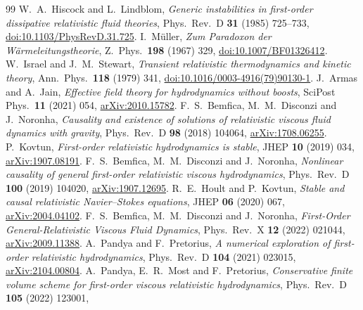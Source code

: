 \clearpage
{}
{}
\begin{thebibliography}{99}
\setlength{\itemsep}{2.5pt}
W.~A.~Hiscock and L.~Lindblom, \emph{Generic instabilities in first-order
dissipative relativistic fluid theories}, Phys.\ Rev.\ D \textbf{31}
(1985) 725--733,
\href{https://doi.org/10.1103/PhysRevD.31.725}{doi:10.1103/PhysRevD.31.725}.
I.~M\"uller, \emph{Zum Paradoxon der W\"armeleitungstheorie},
Z.\ Phys.\ \textbf{198} (1967) 329,
\href{https://doi.org/10.1007/BF01326412}{doi:10.1007/BF01326412}.
W.~Israel and J.~M.~Stewart, \emph{Transient relativistic thermodynamics
and kinetic theory}, Ann.\ Phys.\ \textbf{118} (1979) 341,
\href{https://doi.org/10.1016/0003-4916(79)90130-1}{doi:10.1016/0003-4916(79)90130-1}.
J.~Armas and A.~Jain, \emph{Effective field theory for hydrodynamics
without boosts}, SciPost Phys.\ \textbf{11} (2021) 054,
\href{https://arxiv.org/abs/2010.15782}{arXiv:2010.15782}.
F.~S.~Bemfica, M.~M.~Disconzi and J.~Noronha, \emph{Causality and existence
of solutions of relativistic viscous fluid dynamics with gravity},
Phys.\ Rev.\ D \textbf{98} (2018) 104064,
\href{https://arxiv.org/abs/1708.06255}{arXiv:1708.06255}.
P.~Kovtun, \emph{First-order relativistic hydrodynamics is stable},
JHEP \textbf{10} (2019) 034,
\href{https://arxiv.org/abs/1907.08191}{arXiv:1907.08191}.
F.~S.~Bemfica, M.~M.~Disconzi and J.~Noronha, \emph{Nonlinear causality
of general first-order relativistic viscous hydrodynamics},
Phys.\ Rev.\ D \textbf{100} (2019) 104020,
\href{https://arxiv.org/abs/1907.12695}{arXiv:1907.12695}.
R.~E.~Hoult and P.~Kovtun, \emph{Stable and causal relativistic
Navier--Stokes equations}, JHEP \textbf{06} (2020) 067,
\href{https://arxiv.org/abs/2004.04102}{arXiv:2004.04102}.
F.~S.~Bemfica, M.~M.~Disconzi and J.~Noronha, \emph{First-Order
General-Relativistic Viscous Fluid Dynamics}, Phys.\ Rev.\ X
\textbf{12} (2022) 021044,
\href{https://arxiv.org/abs/2009.11388}{arXiv:2009.11388}.
A.~Pandya and F.~Pretorius, \emph{A numerical exploration of first-order
relativistic hydrodynamics}, Phys.\ Rev.\ D \textbf{104} (2021) 023015,
\href{https://arxiv.org/abs/2104.00804}{arXiv:2104.00804}.
A.~Pandya, E.~R.~Most and F.~Pretorius, \emph{Conservative finite volume
scheme for first-order viscous relativistic hydrodynamics},
Phys.\ Rev.\ D \textbf{105} (2022) 123001,

\end{thebibliography}

